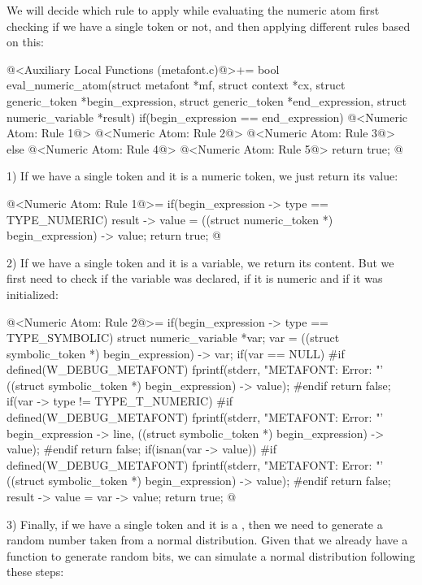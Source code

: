 We will decide which rule to apply while evaluating the numeric atom
first checking if we have a single token or not, and then applying
different rules based on this:

\iniciocodigo
@<Auxiliary Local Functions (metafont.c)@>+=
bool eval_numeric_atom(struct metafont *mf, struct context *cx,
                       struct generic_token *begin_expression,
                       struct generic_token *end_expression,
                       struct numeric_variable *result){
  if(begin_expression == end_expression){
    @<Numeric Atom: Rule 1@>
    @<Numeric Atom: Rule 2@>
    @<Numeric Atom: Rule 3@>
  }
  else{
    @<Numeric Atom: Rule 4@>
    @<Numeric Atom: Rule 5@>
  }
  return true;
}
@

1) If we have a single token and it is a numeric token, we just return
its value:

\iniciocodigo
@<Numeric Atom: Rule 1@>=
if(begin_expression -> type == TYPE_NUMERIC){
  result -> value = ((struct numeric_token *) begin_expression) -> value;
  return true;
}
@
\fimcodigo

2) If we have a single token and it is a variable, we return its
content. But we first need to check if the variable was declared, if
it is numeric and if it was initialized:

\iniciocodigo
@<Numeric Atom: Rule 2@>=
if(begin_expression -> type == TYPE_SYMBOLIC){
  struct numeric_variable *var;
  var = ((struct symbolic_token *) begin_expression) -> var;
  if(var == NULL){
#if defined(W_DEBUG_METAFONT)
    fprintf(stderr, "METAFONT: Error: %
            "'%
            ((struct symbolic_token *) begin_expression) -> value);
#endif
    return false;
  }
  if(var -> type != TYPE_T_NUMERIC){
#if defined(W_DEBUG_METAFONT)
    fprintf(stderr, "METAFONT: Error: %
            "'%
            begin_expression -> line,
            ((struct symbolic_token *) begin_expression) -> value);
#endif
    return false;
  }
  if(isnan(var -> value)){
#if defined(W_DEBUG_METAFONT)
    fprintf(stderr, "METAFONT: Error: %
            "'%
            ((struct symbolic_token *) begin_expression) -> value);
#endif
    return false;
  }
  result -> value = var -> value;
  return true;
}
@
\fimcodigo

3) Finally, if we have a single token and it is
a , then we need to generate a random number
taken from a normal distribution. Given that we already have a
function to generate random bits, we can simulate a normal
distribution following these steps:

